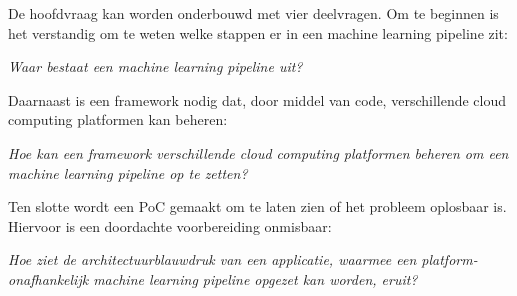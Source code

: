De hoofdvraag kan worden onderbouwd met vier deelvragen. Om te beginnen is het verstandig om te weten welke stappen er in een machine learning pipeline zit:

\begin{quoting}
  \begin{center}
    \textit{
      Waar bestaat een machine learning pipeline uit?
    }
  \end{center}
\end{quoting}\smallskip

Daarnaast is een framework nodig dat, door middel van code, verschillende cloud computing platformen kan beheren:

\begin{quoting}
  \begin{center}
    \textit{
      Hoe kan een framework verschillende cloud computing platformen beheren om een machine learning pipeline op te zetten?
    }
  \end{center}
\end{quoting}\smallskip

Ten slotte wordt een PoC gemaakt om te laten zien of het probleem oplosbaar is. Hiervoor is een doordachte voorbereiding onmisbaar:

\begin{quoting}
  \begin{center}
    \textit{
      Hoe ziet de architectuurblauwdruk van een applicatie, waarmee een platform-onafhankelijk machine learning pipeline opgezet kan worden, eruit?
    }
  \end{center}
\end{quoting}






